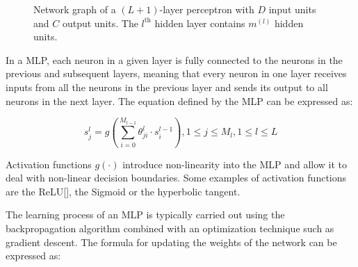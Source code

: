 \documentclass[11pt,english,listoffigures,listoftables]{tfgetsinf}
\begin{document}
\begin{figure}[h]
	\caption[Network graph for a $(L+1)$-layer perceptron.]{Network graph of a $(L+1)$-layer perceptron with $D$ input units and $C$ output units. The $l^{\text{th}}$ hidden layer contains $m^{(l)}$ hidden units.}
	\label{fig:multilayer-perceptron}
\end{figure}


In a MLP, each neuron in a given layer is fully connected to the neurons in the previous and subsequent layers, meaning that every neuron in one layer receives inputs from all the neurons in the previous layer and sends its output to all neurons in the next layer. The equation defined by the MLP can be expressed as:

\begin{equation}
    s_j^l = g(\sum_{i=0}^{M_{l-1}}\theta_{ji}^l \cdot s_i^{l-1}), 1 \leq j \leq M_l, 1 \leq l \leq L
\end{equation}

Activation functions \( g(\cdot)\) introduce non-linearity into the MLP and allow it to deal with non-linear decision boundaries. Some examples of activation functions are the ReLU[], the Sigmoid or the hyperbolic tangent.

The learning process of an MLP is typically carried out using the backpropagation algorithm combined with an optimization technique such as gradient descent. The formula for updating the weights of the network can be expressed as:
\end{document}
